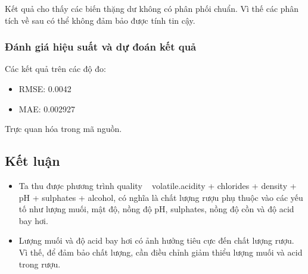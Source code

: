 Kết quả cho thấy các biến thặng dư không có phân phối chuẩn. Vì thế các phân tích về sau có thể không đảm bảo được tính tin cậy.

\subsubsection{Đánh giá hiệu suất và dự đoán kết quả}


Các kết quả trên các độ đo:
\begin{itemize}
    \item RMSE: 0.0042
    \item MAE: 0.002927
\end{itemize}

Trực quan hóa trong mã nguồn.

\subsection{Kết luận}

\begin{itemize}
    \item Ta thu được phương trình quality ~ volatile.acidity + chlorides + density + pH + sulphates + alcohol, có nghĩa là chất lượng rượu phụ thuộc vào các yếu tố như lượng muối, mật độ, nồng độ pH, sulphates, nồng độ cồn và độ acid bay hơi. 
    \item Lượng muối và độ acid bay hơi có ảnh hưởng tiêu cực đến chất lượng rượu. Vì thế, để đảm bảo chất lượng, cần điều chỉnh giảm thiểu lượng muối và acid trong rượu.
\end{itemize}